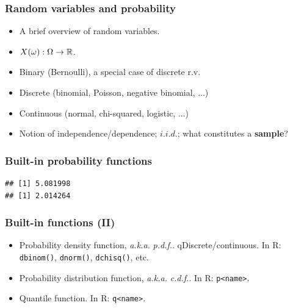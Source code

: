 \begin{frame}
  \frametitle{Random variables and probability}
  \begin{itemize}
  \item A brief overview of random variables. \item $X(\omega) : \Omega
    \to \mathbb{R}$.
  \item Binary (Bernoulli), a special case of discrete r.v.
  \item Discrete (binomial, Poisson, negative binomial, ...)
  \item Continuous (normal, chi-squared, logistic, ...)
  \item Notion of independence/dependence; $i.i.d.$; what constitutes a
    \textbf{sample}?
  \end{itemize}
\end{frame}

\begin{frame}[fragile]
  \frametitle{Built-in probability functions}
\begin{knitrout}\footnotesize
{}\color{fgcolor}\begin{kframe}
\begin{alltt}
 \hlkwb{<-} \hlstd{(}\hlstd{,} \hlopt{/}\hlstd{)}       
 \hlkwb{<-} \hlstd{(}\hlstd{,} \hlstd{,} \hlopt{/}\hlstd{)}   
 \hlkwb{<-} \hlstd{(}\hlstd{)}            
 \hlkwb{<-} \hlstd{(}\hlstd{,} \hlstd{,} \hlstd{)}    
            
\end{alltt}
\begin{verbatim}
## [1] 5.081998
## [1] 2.014264
\end{verbatim}
\end{kframe}
\end{knitrout}

\end{frame}

\begin{frame}
  \frametitle{Built-in functions (II)}
  \begin{itemize}
  \item Probability density function, \textit{a.k.a.} \textit{p.d.f.}.
    qDiscrete/continuous.  In R: \texttt{dbinom()}, \texttt{dnorm()},
    \texttt{dchisq()}, etc.
  \item Probability distribution function, \textit{a.k.a.}
    \textit{c.d.f.}. In R: \texttt{p<name>}.
  \item Quantile function. In R: \texttt{q<name>}.
  \end{itemize}
\end{frame}

